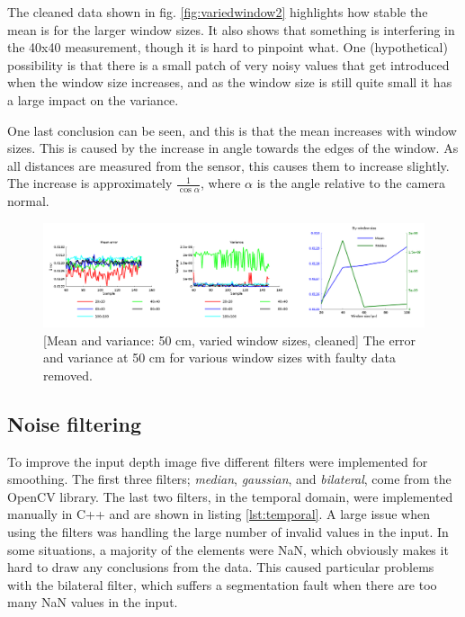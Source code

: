 \documentclass[11pt]{article}
\begin{document}
The cleaned data shown in fig. \vref{fig:variedwindow2} highlights how stable
the mean is for the larger window sizes. It also shows that something is
interfering in the 40x40 measurement, though it is hard to pinpoint what. One
(hypothetical) possibility is that there is a small patch of very noisy values
that get introduced when the window size increases, and as the window size is
still quite small it has a large impact on the variance. \par

One last conclusion can be seen, and this is that the mean increases with window
sizes. This is caused by the increase in angle towards the edges of the
window. As all distances are measured from the sensor, this causes them to
increase slightly. The increase is approximately $\frac{1}{\cos \alpha}$, where
$\alpha$ is the angle relative to the camera normal.\par

\begin{figure}[ht]
  \centering
  \includegraphics[width=1\textwidth]{figures/plot2bywindowsize.png}
  [Mean and variance: 50 cm, varied window sizes,
  cleaned]{\label{fig:variedwindow2} The error and variance at 50 cm for various
    window sizes with faulty data removed.}
\end{figure}

\subsection{Noise filtering}

To improve the input depth image five different filters were implemented for
smoothing. The first three filters; \emph{median}, \emph{gaussian}, and
\emph{bilateral}, come from the OpenCV library. The last two filters, in the
temporal domain, were implemented manually in C++ and are shown in listing
\vref{lst:temporal}. A large issue when using the filters was handling the large
number of invalid values in the input. In some situations, a majority of the
elements were NaN, which obviously makes it hard to draw any conclusions from
the data. This caused particular problems with the bilateral filter, which
suffers a segmentation fault when there are too many NaN values in the
input. \par
\end{document}
